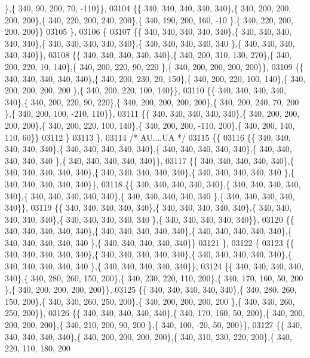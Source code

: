 \begin{DoxyCode}
      \},\{ 340,  90, 200,  70, -110\}\},
03104 \{\{ 340, 340, 340, 340, 340\},\{ 340, 200, 200, 200, 200\},\{ 340, 220, 200, 240, 200\},\{ 340, 190, 200, 160, -10
      \},\{ 340, 220, 200, 200, 200\}\}
03105 \},
03106 \{
03107 \{\{ 340, 340, 340, 340, 340\},\{ 340, 340, 340, 340, 340\},\{ 340, 340, 340, 340, 340\},\{ 340, 340, 340, 340, 340
      \},\{ 340, 340, 340, 340, 340\}\},
03108 \{\{ 340, 340, 340, 340, 340\},\{ 340, 200, 310, 130, 270\},\{ 340, 200, 220,  10, 140\},\{ 340, 200, 220,  90, 220
      \},\{ 340, 200, 200, 200, 200\}\},
03109 \{\{ 340, 340, 340, 340, 340\},\{ 340, 200, 230,  20, 150\},\{ 340, 200, 220, 100, 140\},\{ 340, 200, 200, 200, 200
      \},\{ 340, 200, 220, 100, 140\}\},
03110 \{\{ 340, 340, 340, 340, 340\},\{ 340, 200, 220,  90, 220\},\{ 340, 200, 200, 200, 200\},\{ 340, 200, 240,  70, 200
      \},\{ 340, 200, 100, -210, 110\}\},
03111 \{\{ 340, 340, 340, 340, 340\},\{ 340, 200, 200, 200, 200\},\{ 340, 200, 220, 100, 140\},\{ 340, 200, 200, -110, 
      200\},\{ 340, 200, 140, 110,  60\}\}
03112 \}
03113 \},
03114 \textcolor{comment}{/* AU....UA */}
03115 \{\{
03116 \{\{ 340, 340, 340, 340, 340\},\{ 340, 340, 340, 340, 340\},\{ 340, 340, 340, 340, 340\},\{ 340, 340, 340, 340, 340
      \},\{ 340, 340, 340, 340, 340\}\},
03117 \{\{ 340, 340, 340, 340, 340\},\{ 340, 340, 340, 340, 340\},\{ 340, 340, 340, 340, 340\},\{ 340, 340, 340, 340, 340
      \},\{ 340, 340, 340, 340, 340\}\},
03118 \{\{ 340, 340, 340, 340, 340\},\{ 340, 340, 340, 340, 340\},\{ 340, 340, 340, 340, 340\},\{ 340, 340, 340, 340, 340
      \},\{ 340, 340, 340, 340, 340\}\},
03119 \{\{ 340, 340, 340, 340, 340\},\{ 340, 340, 340, 340, 340\},\{ 340, 340, 340, 340, 340\},\{ 340, 340, 340, 340, 340
      \},\{ 340, 340, 340, 340, 340\}\},
03120 \{\{ 340, 340, 340, 340, 340\},\{ 340, 340, 340, 340, 340\},\{ 340, 340, 340, 340, 340\},\{ 340, 340, 340, 340, 340
      \},\{ 340, 340, 340, 340, 340\}\}
03121 \},
03122 \{
03123 \{\{ 340, 340, 340, 340, 340\},\{ 340, 340, 340, 340, 340\},\{ 340, 340, 340, 340, 340\},\{ 340, 340, 340, 340, 340
      \},\{ 340, 340, 340, 340, 340\}\},
03124 \{\{ 340, 340, 340, 340, 340\},\{ 340, 280, 260, 150, 200\},\{ 340, 230, 220, 110, 200\},\{ 340, 170, 160,  50, 200
      \},\{ 340, 200, 200, 200, 200\}\},
03125 \{\{ 340, 340, 340, 340, 340\},\{ 340, 280, 260, 150, 200\},\{ 340, 340, 260, 250, 200\},\{ 340, 200, 200, 200, 200
      \},\{ 340, 340, 260, 250, 200\}\},
03126 \{\{ 340, 340, 340, 340, 340\},\{ 340, 170, 160,  50, 200\},\{ 340, 200, 200, 200, 200\},\{ 340, 210, 200,  90, 200
      \},\{ 340, 100, -20,  50, 200\}\},
03127 \{\{ 340, 340, 340, 340, 340\},\{ 340, 200, 200, 200, 200\},\{ 340, 310, 230, 220, 200\},\{ 340, 220, 110, 180, 200

\end{DoxyCode}
